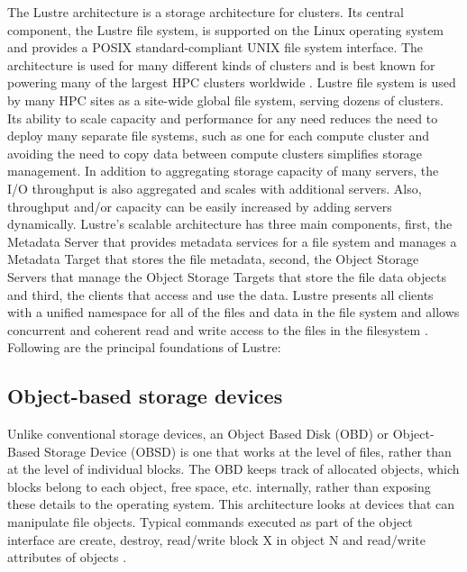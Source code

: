 \documentclass[9pt,twocolumn,twoside]{styles/osajnl}
\begin{document}
The Lustre architecture is a storage architecture for clusters. Its
central component, the Lustre file system, is supported on the Linux
operating system and provides a POSIX standard-compliant UNIX file
system interface. The architecture is used for many different kinds of
clusters and is best known for powering many of the largest HPC
clusters worldwide \cite{www-manual}. Lustre file system is used by
many HPC sites as a site-wide global file system, serving dozens of
clusters. Its ability to scale capacity and performance for any need
reduces the need to deploy many separate file systems, such as one for
each compute cluster and avoiding the need to copy data between
compute clusters simplifies storage management. In addition to
aggregating storage capacity of many servers, the I/O throughput is
also aggregated and scales with additional servers. Also, throughput
and/or capacity can be easily increased by adding servers
dynamically. Lustre’s scalable architecture has three main components,
first, the Metadata Server that provides metadata services for a file
system and manages a Metadata Target that stores the file metadata,
second, the Object Storage Servers that manage the Object Storage
Targets that store the file data objects and third, the clients that
access and use the data. Lustre presents all clients with a unified
namespace for all of the files and data in the file system and allows
concurrent and coherent read and write access to the files in the
filesystem \cite{www-getstart}.
\newline
Following are the principal foundations of Lustre: 

\subsection{Object-based storage devices}
Unlike conventional storage devices, an Object Based Disk (OBD) or
Object-Based Storage Device (OBSD) is one that works at the level of
files, rather than at the level of individual blocks. The OBD keeps
track of allocated objects, which blocks belong to each object, free
space, etc. internally, rather than exposing these details to the
operating system. This architecture looks at devices that can
manipulate file objects. Typical commands executed as part of the
object interface are create, destroy, read/write block X in object N
and read/write attributes of objects \cite{www-obd-wikipedia}.
\end{document}
